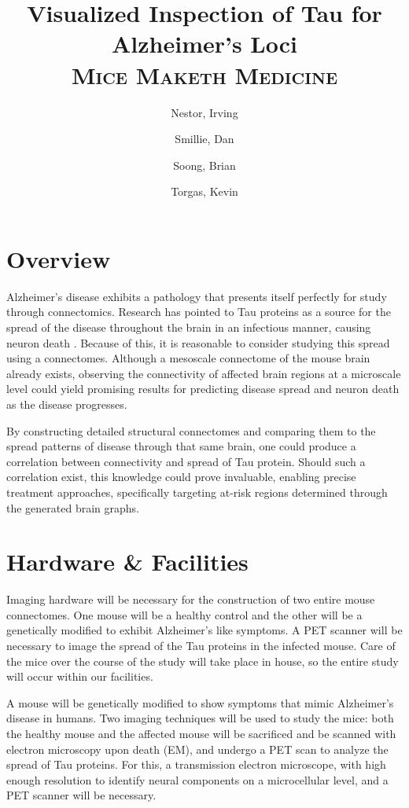 \documentclass[11pt]{article}
\title{Visualized Inspection of Tau for Alzheimer’s Loci \\{\Large \textsc{Mice Maketh Medicine}}}
\author{
  Nestor, Irving
  \and
  Smillie, Dan
  \and
  Soong, Brian
  \and
  Torgas, Kevin
  \and
}
\begin{document}
\maketitle

\section{Overview}

Alzheimer’s disease exhibits a pathology that presents itself perfectly for study through connectomics. Research has pointed to Tau proteins as a source for the spread of the disease throughout the brain in an infectious manner, causing neuron death \cite{sciencemag}. Because of this, it is reasonable to consider studying this spread using a connectomes. Although a mesoscale connectome of the mouse brain already exists, observing the connectivity of affected brain regions at a microscale level could yield promising results for predicting disease spread and neuron death as the disease progresses. 

By constructing detailed structural connectomes and comparing them to the spread patterns of disease through that same brain, one could produce a correlation between connectivity and spread of Tau protein. Should such a correlation exist, this knowledge could prove invaluable, enabling precise treatment approaches, specifically targeting at-risk regions determined through the generated brain graphs.

\section{Hardware \& Facilities}

Imaging hardware will be necessary for the construction of two entire mouse connectomes. One mouse will be a healthy control and the other will be a genetically modified to exhibit Alzheimer’s like symptoms. A PET scanner will be necessary to image the spread of the Tau proteins in the infected mouse. Care of the mice over the course of the study will take place in house, so the entire study will occur within our facilities. 

A mouse will be genetically modified to show symptoms that mimic Alzheimer's disease in humans. Two imaging techniques will be used to study the mice: both the healthy mouse and the affected mouse will be sacrificed and be scanned with electron microscopy upon death (EM), and undergo a PET scan to analyze the spread of Tau proteins. For this, a transmission electron microscope, with high enough resolution to identify neural components on a microcellular level,  and a PET scanner will be necessary. 
\end{document}
